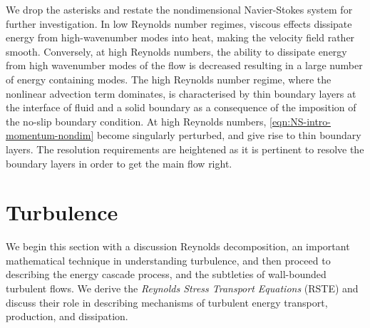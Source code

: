 We drop the asterisks and restate the nondimensional Navier-Stokes system for further investigation.
In low Reynolds number regimes, viscous effects dissipate energy from high-wavenumber modes into heat, making the velocity field rather smooth. Conversely, at high Reynolds numbers, the ability to dissipate energy from high wavenumber modes of the flow is decreased resulting in a large number of energy containing modes. The high Reynolds number regime, where the nonlinear advection term dominates, is characterised by thin boundary layers at the interface of fluid and a solid boundary as a consequence of the imposition of the no-slip boundary condition. At high Reynolds numbers, \autoref{eqn:NS-intro-momentum-nondim} become singularly perturbed, and give rise to thin boundary layers. \cite{wall-energy-cascade} The resolution requirements are heightened as it is pertinent to resolve the boundary layers in order to get the main flow right. 
\section{Turbulence}
We begin this section with a discussion Reynolds decomposition, an important mathematical technique in understanding turbulence, and then proceed to describing the energy cascade process, and the subtleties of wall-bounded turbulent flows. We derive the \textit{Reynolds Stress Transport Equations} (RSTE) and discuss their role in describing mechanisms of turbulent energy transport, production, and dissipation.


